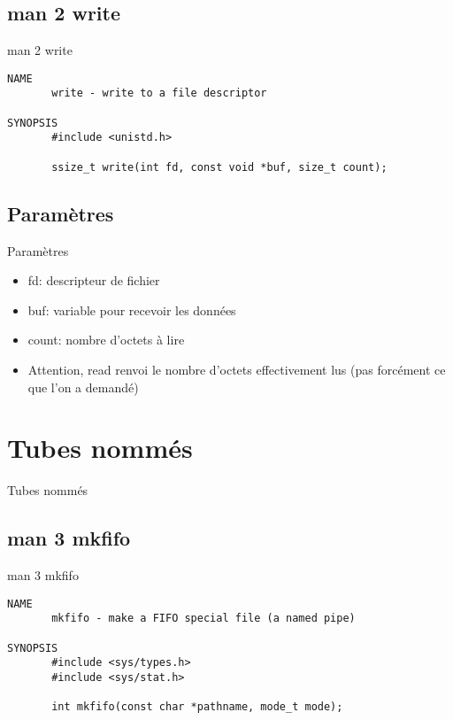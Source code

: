 \begin{frame}[containsverbatim]{\sectitle}
\def\subsectitle{man 2 write}
\subsection{\subsectitle}
\begin{block}{\subsectitle}
\begin{verbatim}
NAME
       write - write to a file descriptor

SYNOPSIS
       #include <unistd.h>

       ssize_t write(int fd, const void *buf, size_t count);
\end{verbatim}
\end{block}
\end{frame}

\begin{frame}[containsverbatim]{\sectitle}
\def\subsectitle{Paramètres}
\subsection{\subsectitle}
\begin{block}{\subsectitle}
\begin{itemize}
    \item fd: descripteur de fichier
    \item buf: variable pour recevoir les données
    \item count: nombre d'octets à lire
    \item Attention, read renvoi le nombre d'octets effectivement lus (pas
    forcément ce que l'on a demandé)
\end{itemize}
\end{block}
\end{frame}

\def\sectitle{Tubes nommés}
\section{\sectitle}
\begin{frame}[containsverbatim]{\sectitle}
\def\subsectitle{man 3 mkfifo}
\subsection{\subsectitle}
\begin{block}{\subsectitle}
\begin{verbatim}
NAME
       mkfifo - make a FIFO special file (a named pipe)

SYNOPSIS
       #include <sys/types.h>
       #include <sys/stat.h>

       int mkfifo(const char *pathname, mode_t mode);
\end{verbatim}
\end{block}
\end{frame}

